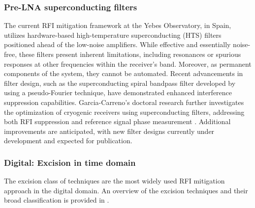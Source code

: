 \subsubsection{Pre-LNA superconducting filters}
The current RFI mitigation framework at the Yebes Observatory, in Spain, utilizes hardware-based high-temperature superconducting (HTS) filters positioned ahead of the low-noise amplifiers. While effective and essentially noise-free, these filters present inherent limitations, including resonances or spurious responses at other frequencies within the receiver’s band. Moreover, as permanent components of the system, they cannot be automated. Recent advancements in filter design, such as the superconducting spiral bandpass filter developed by \citep{huang2018superconducting} using a pseudo-Fourier technique, have demonstrated enhanced interference suppression capabilities. Garcia-Carreno’s doctoral research further investigates the optimization of cryogenic receivers using superconducting filters, addressing both RFI suppression and reference signal phase measurement \citep{garcia2023optimizacion,lopez2021tri}. Additional improvements are anticipated, with new filter designs currently under development and expected for publication.

\subsubsection{Digital: Excision in time domain}

The excision class of techniques are the most widely used RFI mitigation approach in the digital domain. An overview of the excision techniques and their broad classification is provided in \citep{buch2019rfic}.

